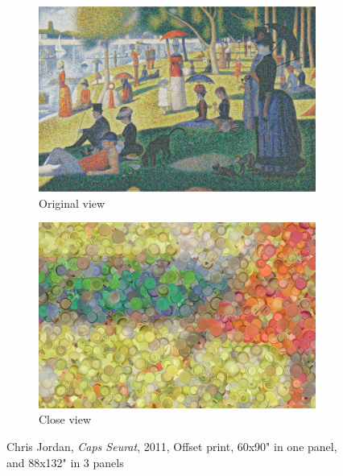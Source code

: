 \begin{figure}[h!]
\begin{subfigure}{.48\textwidth}
  \centering
  \includegraphics[width=\linewidth]{graphics/ChrisJordan_Numbers_OriginalView.jpg}
  \caption{Original view}
  \label{fig:ChrisJordan_Numbers_OriginalView}
\end{subfigure}
\hfill
\begin{subfigure}{.48\textwidth}
  \centering
  \includegraphics[width=\linewidth]{graphics/ChrisJordan_Numbers_CloseView.jpg}
  \caption{Close view}
  \label{fig:ChrisJordan_Numbers_CloseView}
\end{subfigure}
\caption{Chris Jordan, \textit{Caps Seurat}, 2011, Offset print, 60x90" in one panel, and 88x132" in 3 panels}
\label{fig:ChrisJordan_Numbers_CapsSeurat}
\end{figure}

